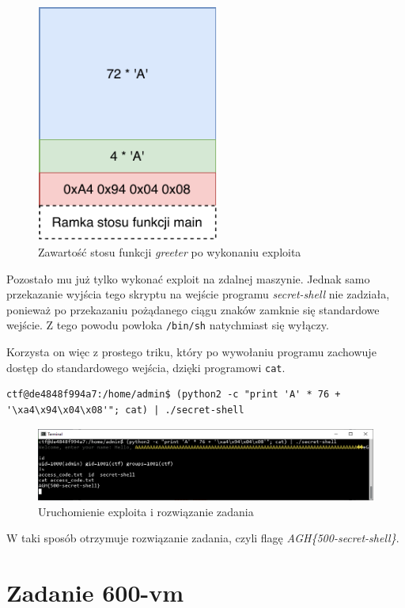 \documentclass[language=polish,type=eng]{aghmodern}
\begin{document}
\begin{appendices}
\begin{figure}[H]
\centering
\includegraphics[width=6cm]{500_overflow}
\caption{Zawartość stosu funkcji \emph{greeter} po wykonaniu exploita}
\end{figure}

Pozostało mu już tylko wykonać exploit na zdalnej maszynie. Jednak samo przekazanie
wyjścia tego skryptu na wejście programu \emph{secret-shell} nie zadziała, ponieważ
po przekazaniu pożądanego ciągu znaków zamknie się standardowe wejście.
Z tego powodu powłoka \texttt{/bin/sh} natychmiast się wyłączy.

Korzysta on więc z prostego triku, który po wywołaniu programu zachowuje dostęp
do standardowego wejścia, dzięki programowi \texttt{cat}.

\begin{verbatim}
ctf@de4848f994a7:/home/admin$ (python2 -c "print 'A' * 76 + '\xa4\x94\x04\x08'"; cat) | ./secret-shell
\end{verbatim}

\begin{figure}[H]
\centering
\includegraphics[width=\textwidth]{500_solution}
\caption{Uruchomienie exploita i rozwiązanie zadania}
\end{figure}

W taki sposób otrzymuje rozwiązanie zadania, czyli flagę \emph{AGH\{500-secret-shell\}}.

\section{Zadanie 600-vm}


\end{appendices}
\end{document}
